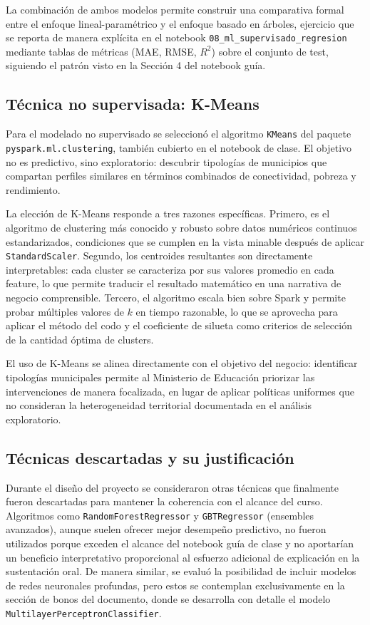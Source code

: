 La combinación de ambos modelos permite construir una comparativa formal entre el enfoque lineal-paramétrico y el enfoque basado en árboles, ejercicio que se reporta de manera explícita en el notebook \texttt{08\_ml\_supervisado\_regresion} mediante tablas de métricas (MAE, RMSE, $R^2$) sobre el conjunto de test, siguiendo el patrón visto en la Sección 4 del notebook guía.

\subsection{Técnica no supervisada: K-Means}
Para el modelado no supervisado se seleccionó el algoritmo \texttt{KMeans} del paquete \texttt{pyspark.ml.clustering}, también cubierto en el notebook de clase. El objetivo no es predictivo, sino exploratorio: descubrir tipologías de municipios que compartan perfiles similares en términos combinados de conectividad, pobreza y rendimiento.

La elección de K-Means responde a tres razones específicas. Primero, es el algoritmo de clustering más conocido y robusto sobre datos numéricos continuos estandarizados, condiciones que se cumplen en la vista minable después de aplicar \texttt{StandardScaler}. Segundo, los centroides resultantes son directamente interpretables: cada cluster se caracteriza por sus valores promedio en cada feature, lo que permite traducir el resultado matemático en una narrativa de negocio comprensible. Tercero, el algoritmo escala bien sobre Spark y permite probar múltiples valores de $k$ en tiempo razonable, lo que se aprovecha para aplicar el método del codo y el coeficiente de silueta como criterios de selección de la cantidad óptima de clusters.

El uso de K-Means se alinea directamente con el objetivo del negocio: identificar tipologías municipales permite al Ministerio de Educación priorizar las intervenciones de manera focalizada, en lugar de aplicar políticas uniformes que no consideran la heterogeneidad territorial documentada en el análisis exploratorio.

\subsection{Técnicas descartadas y su justificación}
Durante el diseño del proyecto se consideraron otras técnicas que finalmente fueron descartadas para mantener la coherencia con el alcance del curso. Algoritmos como \texttt{RandomForestRegressor} y \texttt{GBTRegressor} (ensembles avanzados), aunque suelen ofrecer mejor desempeño predictivo, no fueron utilizados porque exceden el alcance del notebook guía de clase y no aportarían un beneficio interpretativo proporcional al esfuerzo adicional de explicación en la sustentación oral. De manera similar, se evaluó la posibilidad de incluir modelos de redes neuronales profundas, pero estos se contemplan exclusivamente en la sección de bonos del documento, donde se desarrolla con detalle el modelo \texttt{MultilayerPerceptronClassifier}.

